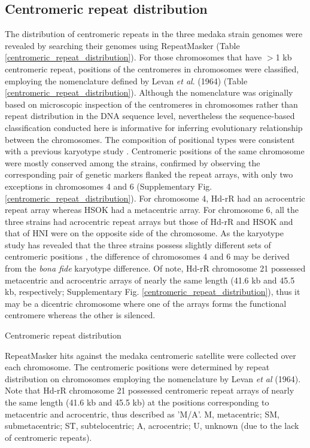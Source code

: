\subsection*{Centromeric repeat distribution}
  The distribution of centromeric repeats in the three medaka strain genomes were revealed by searching their genomes using RepeatMasker (Table \ref{centromeric_repeat_distribution}). For those chromosomes that have $>$1 kb centromeric repeat, positions of the centromeres in chromosomes were classified, employing the nomenclature defined by Levan \textit{et al}. (1964) (Table \ref{centromeric_repeat_distribution}). Although the nomenclature was originally based on microscopic inspection of the centromeres in chromosomes rather than repeat distribution in the DNA sequence level, nevertheless the sequence-based classification conducted here is informative for inferring evolutionary relationship between the chromosomes. The composition of positional types were consistent with a previous karyotype study \cite{}. Centromeric positions of the same chromosome were mostly conserved among the strains, confirmed by observing the corresponding pair of genetic markers flanked the repeat arrays, with only two exceptions in chromosomes 4 and 6 (Supplementary Fig. \ref{centromeric_repeat_distribution}). For chromosome 4, Hd-rR had an acrocentric repeat array whereas HSOK had a metacentric array. For chromosome 6, all the three strains had acrocentric repeat arrays but those of Hd-rR and HSOK and that of HNI were on the opposite side of the chromosome. As the karyotype study has revealed that the three strains possess slightly different sets of centromeric positions \cite{}, the difference of chromosomes 4 and 6 may be derived from the \textit{bona fide} karyotype difference. Of note, Hd-rR chromosome 21 possessed metacentric and acrocentric arrays of nearly the same length (41.6 kb and 45.5 kb, respectively; Supplementary Fig. \ref{centromeric_repeat_distribution}), thus it may be a dicentric chromosome where one of the arrays forms the functional centromere whereas the other is silenced.


  \begin{table*}[htp]
    \centering
    \caption{Centromeric repeat distribution}
    
    \label{centromeric_repeat_distribution}
    \caption*{{\small
      RepeatMasker hits against the medaka centromeric satellite were collected over each chromosome. The centromeric positions were determined by repeat distribution on chromosomes employing the nomenclature by Levan \textit{et al} (1964). Note that Hd-rR chromosome 21 possessed centromeric repeat arrays of nearly the same length (41.6 kb and 45.5 kb) at the positions corresponding to metacentric and acrocentric, thus described as 'M/A'. M, metacentric; SM, submetacentric; ST, subtelocentric; A, acrocentric; U, unknown (due to the lack of centromeric repeats).
    }}
  \end{table*}



